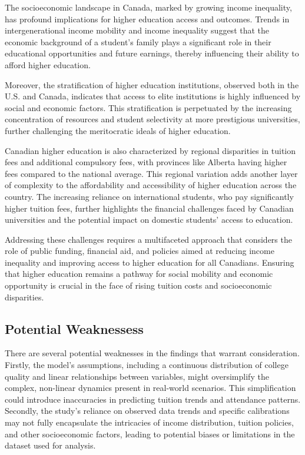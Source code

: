 \documentclass[
  letterpaper,
  DIV=11,
  numbers=noendperiod]{scrartcl}
\begin{document}
The socioeconomic landscape in Canada, marked by growing income
inequality, has profound implications for higher education access and
outcomes. Trends in intergenerational income mobility and income
inequality suggest that the economic background of a student's family
plays a significant role in their educational opportunities and future
earnings, thereby influencing their ability to afford higher education.

Moreover, the stratification of higher education institutions, observed
both in the U.S. and Canada, indicates that access to elite institutions
is highly influenced by social and economic factors. This stratification
is perpetuated by the increasing concentration of resources and student
selectivity at more prestigious universities, further challenging the
meritocratic ideals of higher education.

Canadian higher education is also characterized by regional disparities
in tuition fees and additional compulsory fees, with provinces like
Alberta having higher fees compared to the national average. This
regional variation adds another layer of complexity to the affordability
and accessibility of higher education across the country. The increasing
reliance on international students, who pay significantly higher tuition
fees, further highlights the financial challenges faced by Canadian
universities and the potential impact on domestic students' access to
education.

Addressing these challenges requires a multifaceted approach that
considers the role of public funding, financial aid, and policies aimed
at reducing income inequality and improving access to higher education
for all Canadians. Ensuring that higher education remains a pathway for
social mobility and economic opportunity is crucial in the face of
rising tuition costs and socioeconomic disparities.

\subsection{Potential Weaknessess}\label{potential-weaknessess}

There are several potential weaknesses in the findings that warrant
consideration. Firstly, the model's assumptions, including a continuous
distribution of college quality and linear relationships between
variables, might oversimplify the complex, non-linear dynamics present
in real-world scenarios. This simplification could introduce
inaccuracies in predicting tuition trends and attendance patterns.
Secondly, the study's reliance on observed data trends and specific
calibrations may not fully encapsulate the intricacies of income
distribution, tuition policies, and other socioeconomic factors, leading
to potential biases or limitations in the dataset used for analysis.
\end{document}

